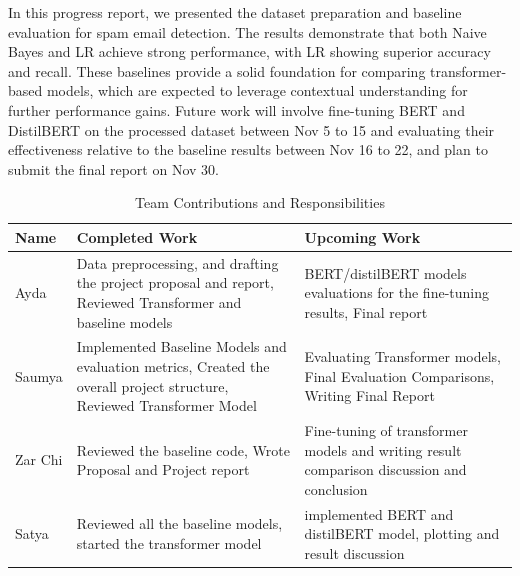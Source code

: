 \documentclass[12pt]{article}
\begin{document}
In this progress report, we presented the dataset preparation and baseline evaluation for spam email detection. The results demonstrate that both Naive Bayes and LR achieve strong performance, with LR showing superior accuracy and recall. These baselines provide a solid foundation for comparing transformer-based models, which are expected to leverage contextual understanding for further performance gains. Future work will involve fine-tuning BERT and DistilBERT on the processed dataset between Nov 5 to 15 and evaluating their effectiveness relative to the baseline results between Nov 16 to 22, and plan to submit the final report on Nov 30.

\begin{table}[h!]
\centering
\caption{Team Contributions and Responsibilities}
\renewcommand{\arraystretch}{1.2}
\begin{tabular}{|l|p{6cm}|p{6cm}|}
\hline
\textbf{Name} & 
\textbf{Completed Work} & 
\textbf{Upcoming Work} \\
\hline
Ayda & Data preprocessing, and drafting the project proposal and report, Reviewed Transformer and baseline models& BERT/distilBERT models evaluations for the fine-tuning results, Final report  \\
\hline
Saumya & Implemented Baseline Models and evaluation metrics, Created the overall project structure, Reviewed Transformer Model  & Evaluating Transformer models, Final Evaluation Comparisons, Writing Final Report \\
\hline
Zar Chi& Reviewed the baseline code, Wrote Proposal and Project report & Fine-tuning of transformer models and writing result comparison discussion and conclusion\\
\hline
Satya  & Reviewed all the baseline models, started the transformer model & implemented BERT and distilBERT model, plotting and result discussion   \\
\hline
\end{tabular}
\label{tab:project_contribution}
\end{table}

\newpage

\end{document}
